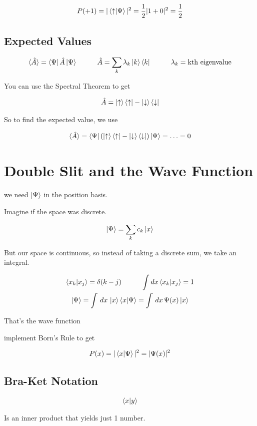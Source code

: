 \documentclass[fleqn]{report}
\newcommand{\hp}{\hspace{1cm}}
\newcommand{\equations} [1] {
\begin{gather*}
#1
\end{gather*}
}
\begin{document}
\equations{
    P(+1)
    =
    |\bra{\uparrow}\ket{\Psi}|^2
    =
    \frac{1}{2}
    |1
    +
    0|^2
    =
    \frac{1}{2}
}

\subsection{Expected Values}
\equations{
    \langle \hat A \rangle 
    =
    \bra{\Psi} \hat A \ket{\Psi}
    \hp 
    \hat A 
    =
    \sum_k 
    \lambda_k 
    \ket{k} \bra{k}
    \hp 
    \lambda_k 
    =
    \textrm{kth eigenvalue}
}

You can use the Spectral Theorem to get 
\equations{
    \hat A 
    =
    \ket{\uparrow}
    \bra{\uparrow}
    -
    \ket{\downarrow}
    \bra{\downarrow}
}

So to find the expected value, we use 

\equations{
    \langle \hat A \rangle 
    =
    \bra{\Psi} \left(
        \ket{\uparrow}
        \bra{\uparrow}
        -
        \ket{\downarrow}
        \bra{\downarrow}
    \right) \ket{\Psi}
    =
    \ldots 
    = 0
}

\section{Double Slit and the Wave Function}
we need $\ket{\Psi}$ in the position basis. 

Imagine if the space was discrete. 
\equations{
    \ket{\Psi}
    =
    \sum_k 
    c_k \ket{x}
}

But our space is continuous, so instead of taking a discrete sum, 
we take an integral. 

\equations{
    \bra{x_k} \ket{x_j}
    =
    \delta (k - j)
    \hp 
    \int dx 
    \bra{x_k} \ket{x_j}
    =
    1
    \\
    \ket{\Psi}
    =
    \int \, dx \,
    \ket{x} \bra{x} \ket{\Psi}
    =
    \int \, dx \, 
    \Psi(x) \ket{x}
}

That's the wave function 

implement Born's Rule to get 

\equations{
    P(x)
    =
    |\bra{x}\ket{\Psi}|^2
    =
    |\Psi(x)|^2
}

\subsection{Bra-Ket Notation}
\equations{
    \bra{x} \ket{y}
}
Is an inner product that yields just 1 number.
\end{document}
